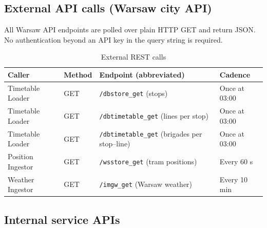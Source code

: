 \documentclass[11pt,a4paper]{article}
\newcommand{\hd}[1]{\textbf{\small #1}}
\begin{document}
\subsection{External API calls (Warsaw city API)}

All Warsaw API endpoints are polled over plain HTTP GET and return JSON.
No authentication beyond an API key in the query string is required.

\begin{table}[H]
\centering
\caption{External REST calls}
\renewcommand{\arraystretch}{1.38}
\begin{tabularx}{\linewidth}{L{3.4cm} C{1.2cm} L{2.8cm} X}
\toprule
\hd{Caller} & \hd{Method} & \hd{Endpoint (abbreviated)} & \hd{Cadence} \\
\midrule
{}
Timetable Loader & GET & \texttt{/dbstore\_get} (stops) & Once at 03:00 \\
Timetable Loader & GET & \texttt{/dbtimetable\_get} (lines per stop) & Once at 03:00 \\
Timetable Loader & GET & \texttt{/dbtimetable\_get} (brigades per stop--line) & Once at 03:00 \\
Position Ingestor & GET & \texttt{/wsstore\_get} (tram positions) & Every 60 s \\
Weather Ingestor & GET & \texttt{/imgw\_get} (Warsaw weather) & Every 10 min \\
\bottomrule
\end{tabularx}
\end{table}

\subsection{Internal service APIs}
\end{document}
